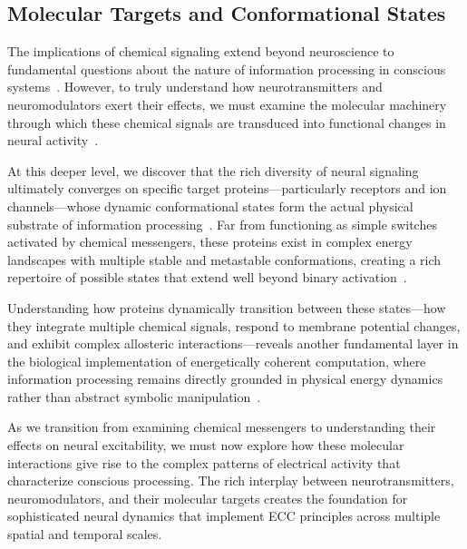\subsection*{Molecular Targets and Conformational States~}

The implications of chemical signaling extend beyond neuroscience to fundamental questions about the nature of information processing in conscious systems~\cite{Dayan2012, butlin2023consciousnessartificialintelligenceinsights}. However, to truly understand how neurotransmitters and neuromodulators exert their effects, we must examine the molecular machinery through which these chemical signals are transduced into functional changes in neural activity~\cite{Marder2012, Choquet2013}.

At this deeper level, we discover that the rich diversity of neural signaling ultimately converges on specific target proteins—particularly receptors and ion channels—whose dynamic conformational states form the actual physical substrate of information processing~\cite{Frauenfelder2009, Nussinov2013}. Far from functioning as simple switches activated by chemical messengers, these proteins exist in complex energy landscapes with multiple stable and metastable conformations, creating a rich repertoire of possible states that extend well beyond binary activation~\cite{Henzler-Wildman2007, Bezanilla2002}.

Understanding how proteins dynamically transition between these states—how they integrate multiple chemical signals, respond to membrane potential changes, and exhibit complex allosteric interactions—reveals another fundamental layer in the biological implementation of energetically coherent computation, where information processing remains directly grounded in physical energy dynamics rather than abstract symbolic manipulation~\cite{Balchin2016, Zhou2008}.

As we transition from examining chemical messengers to understanding their effects on neural excitability, we must now explore how these molecular interactions give rise to the complex patterns of electrical activity that characterize conscious processing. The rich interplay between neurotransmitters, neuromodulators, and their molecular targets creates the foundation for sophisticated neural dynamics that implement ECC principles across multiple spatial and temporal scales.
